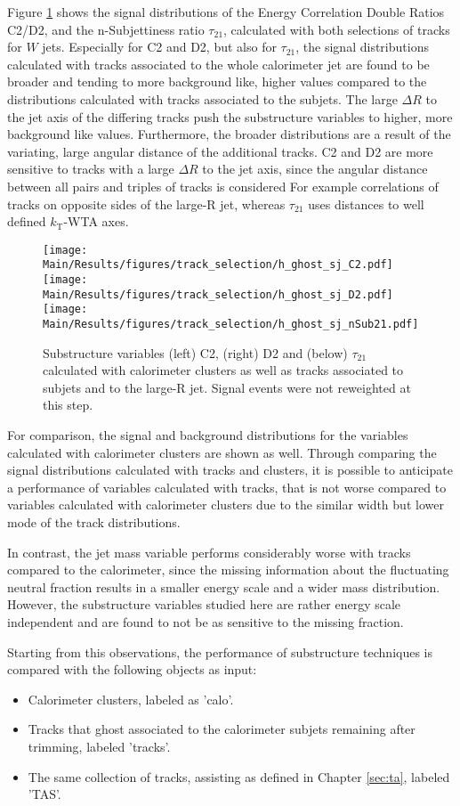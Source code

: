 Figure \ref{fig:selection} shows the signal distributions of the Energy Correlation Double Ratios C2/D2, and the n-Subjettiness ratio $\tau_{21}$, calculated with both selections of tracks for $W$ jets. Especially for C2 and D2, but also for $\tau_{21}$, the signal distributions calculated with tracks associated to the whole calorimeter jet are found to be broader and tending to more background like, higher values compared to the distributions calculated with tracks associated to the subjets. The large $\Delta R$ to the jet axis of the differing tracks push the substructure variables to higher, more background like values. Furthermore, the broader distributions are a result of the variating, large angular distance of the additional tracks. C2 and D2 are more sensitive to tracks with a large $\Delta R$ to the jet axis, since the angular distance between all pairs and triples of tracks is considered For example correlations of tracks on opposite sides of the large-R jet, whereas $\tau_{21}$ uses distances to well defined $k_\mathrm{T}$-WTA axes.
\begin{figure}
	\texttt{[image: Main/Results/figures/track\_selection/h\_ghost\_sj\_C2.pdf]} \hspace{1mm}
	\texttt{[image: Main/Results/figures/track\_selection/h\_ghost\_sj\_D2.pdf]}
	\bigskip
	\texttt{[image: Main/Results/figures/track\_selection/h\_ghost\_sj\_nSub21.pdf]}
\caption{\footnotesize{Substructure variables (left) C2, (right) D2 and (below) $\tau_{21}$ calculated with calorimeter clusters as well as tracks associated to subjets and to the large-R jet. Signal events were not reweighted at this step.}}\label{fig:selection}
\end{figure}
For comparison, the signal and background distributions for the variables calculated with calorimeter clusters are shown as well. Through comparing the signal distributions calculated with tracks and clusters, it is possible to anticipate a performance of variables calculated with tracks, that is not worse compared to variables calculated with calorimeter clusters due to the similar width but lower mode of the track distributions.

In contrast, the jet mass variable performs considerably worse with tracks compared to the calorimeter, since the missing information about the fluctuating neutral fraction results in a smaller energy scale and a wider mass distribution. However, the substructure variables studied here are rather energy scale independent and are found to not be as sensitive to the missing fraction.

Starting from this observations, the performance of substructure techniques is compared with the following objects as input:
\begin{itemize}
\item Calorimeter clusters, labeled as 'calo'.
\item Tracks that ghost associated to the calorimeter subjets remaining after trimming, labeled 'tracks'.
\item The same collection of tracks, assisting as defined in Chapter \ref{sec:ta}, labeled 'TAS'.
\end{itemize}